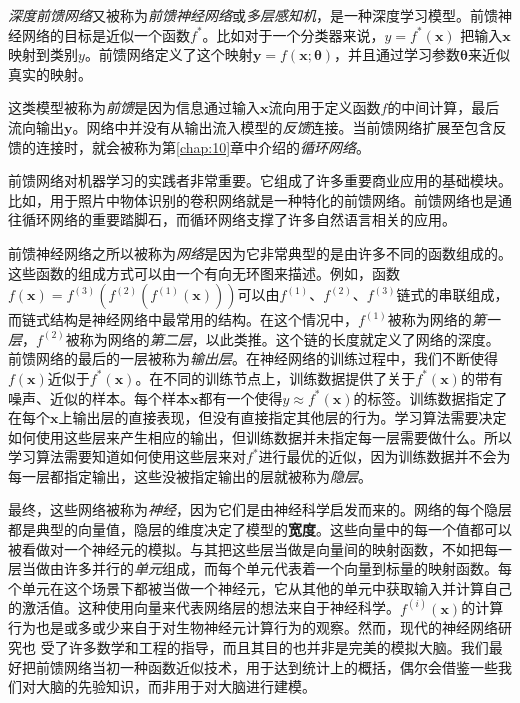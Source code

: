 \documentclass[a4paper,11pt]{book}
\begin{document}
\emph{深度前馈网络}又被称为\emph{前馈神经网络}或\emph{多层感知机}，是一种深度学习模型。前馈神经网络的目标是近似一个函数$f^*$。比如对于一个分类器来说，$y=f^*(\textbf{x})$ 把输入$\textbf{x}$映射到类别$y$。前馈网络定义了这个映射$\textbf{y}=f(\textbf{x};\bm{\theta})$，并且通过学习参数$\bm{\theta}$来近似真实的映射。


这类模型被称为\emph{前馈}是因为信息通过输入$\textbf{x}$流向用于定义函数$f$的中间计算，最后流向输出$\textbf{y}$。网络中并没有从输出流入模型的\emph{反馈}连接。当前馈网络扩展至包含反馈的连接时，就会被称为第\ref{chap:10}章中介绍的\emph{循环网络}。


前馈网络对机器学习的实践者非常重要。它组成了许多重要商业应用的基础模块。比如，用于照片中物体识别的卷积网络就是一种特化的前馈网络。前馈网络也是通往循环网络的重要踏脚石，而循环网络支撑了许多自然语言相关的应用。


前馈神经网络之所以被称为\emph{网络}是因为它非常典型的是由许多不同的函数组成的。这些函数的组成方式可以由一个有向无环图来描述。例如，函数$f(\textbf{x})=f^{(3)}(f^{(2)}(f^{(1)}(\textbf{x})))$可以由$f^{(1)}$、$f^{(2)}$、$f^{(3)}$链式的串联组成，而链式结构是神经网络中最常用的结构。在这个情况中，$f^{(1)}$被称为网络的\emph{第一层}，$f^{(2)}$被称为网络的\emph{第二层}，以此类推。这个链的长度就定义了网络的深度。前馈网络的最后的一层被称为\emph{输出层}。在神经网络的训练过程中，我们不断使得$f(\textbf{x})$近似于$f^*(\textbf{x})$。在不同的训练节点上，训练数据提供了关于$f^*(\bm{x})$的带有噪声、近似的样本。每个样本$\bm{x}$都有一个使得$y \approx f^*(\bm{x})$的标签。训练数据指定了在每个$\bm{x}$上输出层的直接表现，但没有直接指定其他层的行为。学习算法需要决定如何使用这些层来产生相应的输出，但训练数据并未指定每一层需要做什么。所以学习算法需要知道如何使用这些层来对$f^*$进行最优的近似，因为训练数据并不会为每一层都指定输出，这些没被指定输出的层就被称为\emph{隐层}。


最终，这些网络被称为\emph{神经}，因为它们是由神经科学启发而来的。网络的每个隐层都是典型的向量值，隐层的维度决定了模型的\textbf{宽度}。这些向量中的每一个值都可以被看做对一个神经元的模拟。与其把这些层当做是向量间的映射函数，不如把每一层当做由许多并行的\emph{单元}组成，而每个单元代表着一个向量到标量的映射函数。每个单元在这个场景下都被当做一个神经元，它从其他的单元中获取输入并计算自己的激活值。这种使用向量来代表网络层的想法来自于神经科学。$f^{(i)}(\bm{x})$的计算行为也是或多或少来自于对生物神经元计算行为的观察。然而，现代的神经网络研究也
受了许多数学和工程的指导，而且其目的也并非是完美的模拟大脑。我们最好把前馈网络当初一种函数近似技术，用于达到统计上的概括，偶尔会借鉴一些我们对大脑的先验知识，而非用于对大脑进行建模。
\end{document}
